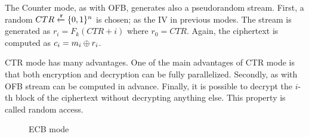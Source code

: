 \label{preliminaries:sym:modes:ctr}

The Counter mode, as with OFB, generates also a pseudorandom stream. First, a random $CTR \xleftarrow{\mathtt{r}}{\{ 0, 1 \}^{n}}$ is chosen; as the IV in previous modes. The stream is generated as $r_i = F_k(CTR + i)$ where $r_0 = CTR$. Again, the ciphertext is computed as $c_i = m_i \oplus r_i$.

CTR mode has many advantages. One of the main advantages of CTR mode is that both encryption and decryption can be fully parallelized. Secondly, as with OFB stream can be computed in advance. Finally, it is possible to decrypt the $i$-th block of the ciphertext without decrypting anything else. This property is called random access.

\begin{figure}[!ht]
    \centering
  \caption{ECB mode}
  \label{fig:sym:block:ecb}
\end{figure}

